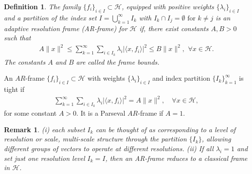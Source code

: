 \documentclass[12pt,titlepage]{amsart}
\newtheorem{rem}[thm]{Remark}
\newtheorem{defn}[thm]{Definition}
\theoremstyle{definition}
\theoremstyle{remark}
\begin{document}
\begin{defn} \label{def.1}
The family $\{ f_i \}_{i \in I} \subset \mathcal{H}$, equipped
with positive weights $\{ \lambda_i \}_{i \in I}$ and a partition
of the index set $I = \bigcup_{k=1}^\infty I_k$ with $I_k \cap I_j
= \emptyset \text{ for } k \neq j$ is an adaptive resolution frame
(AR-frame) for $\mathcal{H}$ if, there exist constants $A, B> 0$
such that
\begin{eqnarray}\label{form1}
 A \|x\|^2 \leq \sum_{k=1}^\infty
\sum_{i \in I_k} \lambda_i | \langle x, f_i \rangle |^2 \leq B
\|x\|^2, \,\ \forall x \in \mathcal{H}.
 \end{eqnarray}
The constants $A$ and $B$ are called the frame bounds.
\end{defn}
An $AR$-frame $\{ f_i \}_{i \in I} \subset \mathcal{H}$ with
weights $\{ \lambda_i \}_{i \in I}$ and index partition
$\{I_k\}_{k=1}^\infty$ is tight if
\begin{eqnarray*}
\sum_{k=1}^\infty \sum_{i \in I_k} \lambda_i | \langle x, f_i
\rangle |^2 = A \|x\|^2, \quad \forall x \in \mathcal{H},
\end{eqnarray*}
for some constant $A > 0$. It is a Parseval $AR$-frame if $A=1$.
\begin{rem}
(i) each subset $I_k$ can be thought of as corresponding to a
level of resolution or scale, multi-scale structure through the
partition $\{ I_k \}$, allowing different groups of vectors to
operate at different resolutions. (ii) If all $\lambda_i = 1$ and
set just one resolution level $I_k = I$, then an AR-frame reduces
to a classical frame in $\mathcal{H}$.
\end{rem}
\end{document}
